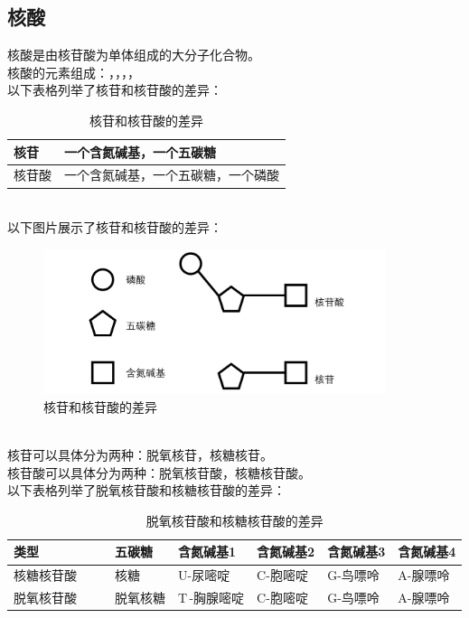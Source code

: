 \documentclass[UTF8]{ctexart}
\begin{document}
\subsection{核酸}
    核酸是由核苷酸为单体组成的大分子化合物。\\[3mm]
    核酸的元素组成：，，，，\\[6mm]
    以下表格列举了核苷和核苷酸的差异：\vspace{5pt}
    \begin{table}[h]
        \begin{center}
            \begin{tabular}{l|l}
                \hline
                核苷\qquad\qquad&一个含氮碱基，一个五碳糖\qquad\qquad\\ \hline
                核苷酸\qquad\qquad&一个含氮碱基，一个五碳糖，一个磷酸\qquad\qquad\\ \hline
            \end{tabular}
            \caption{核苷和核苷酸的差异}
        \end{center}
    \end{table}\\
    以下图片展示了核苷和核苷酸的差异：
    \begin{figure}[h]
        \begin{center}
            \includegraphics[width=10cm]{BiologyImage/2.jpg}
            \caption{核苷和核苷酸的差异}
        \end{center}
    \end{figure}\\
    核苷可以具体分为两种：脱氧核苷，核糖核苷。\\[3mm]
    核苷酸可以具体分为两种：脱氧核苷酸，核糖核苷酸。\\[3mm]
    以下表格列举了脱氧核苷酸和核糖核苷酸的差异：\vspace{5pt}
    \begin{table}[h]
        \begin{center}
            \begin{tabular}{l|l|l|l|l|l}
                \hline
                类型\qquad\qquad&五碳糖&含氮碱基1&含氮碱基2&含氮碱基3&含氮碱基4\\ \hline
                核糖核苷酸~~~~&核糖&U-尿嘧啶&C-胞嘧啶&G-鸟嘌呤&A-腺嘌呤\\ \hline
                脱氧核苷酸~~~~&脱氧核糖&T\,-胸腺嘧啶&C-胞嘧啶&G-鸟嘌呤&A-腺嘌呤\\ \hline
            \end{tabular}
            \caption{脱氧核苷酸和核糖核苷酸的差异}
        \end{center}
    \end{table}\\
\end{document}
